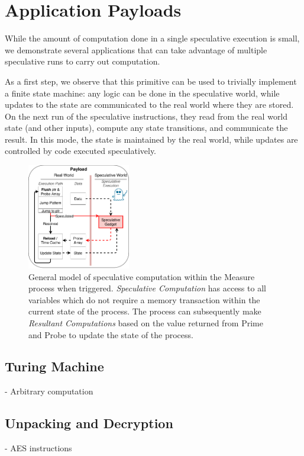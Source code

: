 
\section{Application Payloads}

While the amount of computation done in a single speculative execution is small,
we demonstrate several applications that can take advantage of multiple
speculative runs to carry out computation.

As a first step, we observe that this primitive can be used to trivially
implement a finite state machine: any logic can be done in the speculative
world, while
updates to the state are communicated to the real world where they are stored.
On the next run of the speculative instructions, they read from the real world
state (and other inputs), compute any state transitions, and communicate the
result. In this mode, the state is maintained by the real world, while updates
are controlled by code executed speculatively.

\begin{figure}[t]
    \centering
        \includegraphics[width=0.4\textwidth]{figures/general_model}
    \caption{ General model of speculative computation within the Measure 
        process when triggered. \textit{Speculative Computation} has access
        to all variables which do not require a memory transaction within
        the current state of the process. The process can subsequently make
        \textit{Resultant Computations} based on the value returned from 
        Prime and Probe to update the state of the process. }
    \label{fig:general_model}
\end{figure}


\subsection{Turing Machine}
\label{subsec:turing}
- Arbitrary computation

\subsection{Unpacking and Decryption}
\label{subsec:decryption}
- AES instructions

